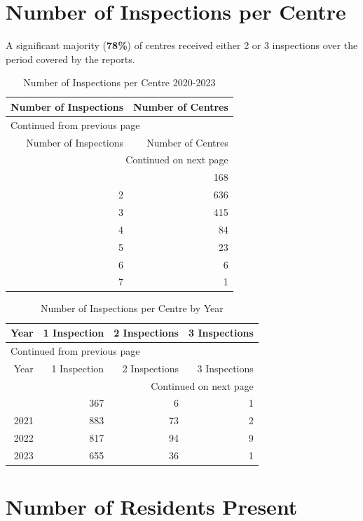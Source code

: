 \documentclass[a4paper,11pt,twoside]{article}
\begin{document}
\section{Number of Inspections per Centre}
\label{sec:orgebd0976}
A significant majority (\textbf{78\%}) of centres received either 2 or 3 inspections over the period covered by the reports.

\begin{longtable}{rr}
\caption{Number of Inspections per Centre 2020-2023}
\\[0pt]
Number of Inspections & Number of Centres\\[0pt]
\hline
\endfirsthead
\multicolumn{2}{l}{Continued from previous page} \\[0pt]
\hline

Number of Inspections & Number of Centres \\[0pt]

\hline
\endhead
\hline\multicolumn{2}{r}{Continued on next page} \\
\endfoot
\endlastfoot
\hline
1 & 168\\[0pt]
2 & 636\\[0pt]
3 & 415\\[0pt]
4 & 84\\[0pt]
5 & 23\\[0pt]
6 & 6\\[0pt]
7 & 1\\[0pt]
\end{longtable}

\clearpage
\begin{longtable}{rrrr}
\caption{Number of Inspections per Centre by Year}
\\[0pt]
Year & 1 Inspection & 2 Inspections & 3 Inspections\\[0pt]
\hline
\endfirsthead
\multicolumn{4}{l}{Continued from previous page} \\[0pt]
\hline

Year & 1 Inspection & 2 Inspections & 3 Inspections \\[0pt]

\hline
\endhead
\hline\multicolumn{4}{r}{Continued on next page} \\
\endfoot
\endlastfoot
\hline
2020 & 367 & 6 & 1\\[0pt]
2021 & 883 & 73 & 2\\[0pt]
2022 & 817 & 94 & 9\\[0pt]
2023 & 655 & 36 & 1\\[0pt]
\end{longtable}
\section{Number of Residents Present}
\label{sec:org9442399}
\end{document}
